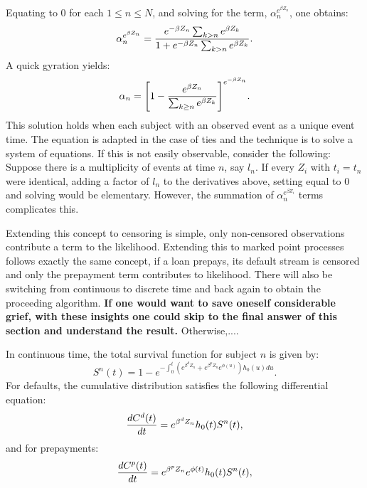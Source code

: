\documentclass[10pt]{article}
\begin{document}
Equating to 0 for each $1 \le n \le N$, and solving for the term, $\alpha_n^{e^{\beta Z_n}}$, one obtains:
$$\alpha_n^{e^{\beta Z_n}}={e^{-\beta Z_n}\sum_{k > n} e^{\beta Z_k} \over 1+ e^{-\beta Z_n}\sum_{k > n} e^{\beta Z_k}}.$$
A quick gyration yields:
$$\alpha_n={\left[{1-{e^{\beta Z_n}\over \sum_{ k \ge n} e^{\beta Z_k}}}\right]}^{e^{-\beta Z_n}}.$$
This solution holds when each subject with an observed event as a unique event time. The equation is adapted in the case of ties and the technique is to 
solve a system of equations.  If this is not easily observable, consider the following:  Suppose there is a multiplicity of events at time $n$, say $l_n$. 
If every $Z_i$ with $t_i=t_n$ were identical, adding a factor of $l_n$ to the derivatives above, setting equal to 0 and solving would be elementary.  
However, the summation of $\alpha_n^{e^{\beta Z_i}}$ terms complicates this.  

Extending this concept to censoring is simple, only non-censored observations contribute a term to the likelihood.  Extending this to marked point
processes follows exactly the same concept, if a loan prepays, its default stream is censored and only the prepayment term contributes to likelihood.
There will also be switching from continuous to discrete time and back again to obtain the proceeding algorithm.  {\bf If one would want to save 
oneself considerable grief, with these insights one could skip to the final answer of this section and understand the result.}  Otherwise,....

In continuous time, the total survival function for subject $n$ is given by:
$$S^n(t)=1-e^{-\int_0^t \left({e^{\beta^dZ_n}+e^{\beta^pZ_n}e^{\phi(u)}}\right)h_0(u)du}.$$
For defaults, the cumulative distribution satisfies the following differential equation:
$${dC^d(t)\over dt}=e^{\beta^dZ_n}h_0(t)S^n(t),$$
and for prepayments:
$${dC^p(t)\over dt}=e^{\beta^pZ_n}e^{\phi(t)}h_0(t)S^n(t),$$
\end{document}
